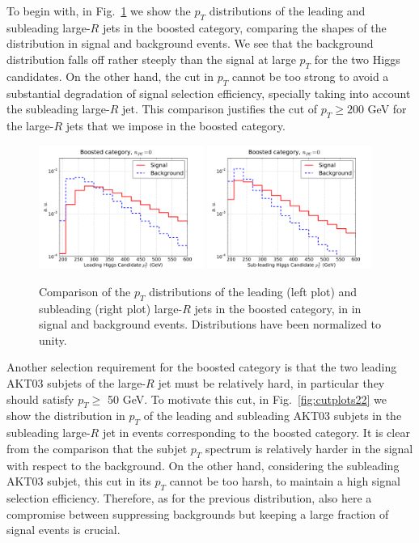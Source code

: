 %
To begin with,
in Fig.~\ref{fig:cutplots1} we show
the $p_T$ distributions
of the
  leading and subleading large-$R$ jets in the boosted category, comparing
  the shapes of the distribution in signal and background events.
  We see that the background distribution
  falls off rather steeply than the signal at large $p_T$
  for the two Higgs candidates.
  On the other hand, the cut in $p_T$ cannot be too strong to avoid
  a substantial degradation of signal selection efficiency,
  specially taking into account the subleading large-$R$ jet.
  This comparison justifies the cut of $p_T \ge 200$ GeV
  for the large-$R$ jets that we impose in the boosted category.
  

\begin{figure}[t]
\begin{center}
 \includegraphics[width=0.48\textwidth]{plots/pt_H0_bst_C1d_noPU.pdf}
 \includegraphics[width=0.48\textwidth]{plots/pt_H1_bst_C1d_noPU.pdf}
\caption{\small  Comparison of the $p_T$ distributions of the
  leading (left plot) and
  subleading (right plot) large-$R$ jets in the boosted category,
  in in signal and background events.
  Distributions have been normalized to unity.
}
\label{fig:cutplots1}
\end{center}
\end{figure}


Another selection requirement for the boosted category is that the two
leading AKT03 subjets of the large-$R$ jet must be relatively hard,
in particular they should satisfy $p_T \ge $ 50 GeV.
%
To motivate this cut, in Fig.~\ref{fig:cutplots22}
we show the distribution in $p_T$ of the leading
and subleading AKT03 subjets in the subleading large-$R$ jet in events
corresponding to the boosted category.
%
It is clear from the comparison that the subjet $p_T$ spectrum is
relatively harder in the signal with respect to the background.
%
On the other hand, considering the subleading AKT03 subjet,
this cut in its  $p_T$
cannot be too harsh, to maintain a high signal selection
efficiency.
%
Therefore,
as for the previous distribution, also here 
a compromise between suppressing backgrounds but keeping a large fraction of
signal events is crucial.


